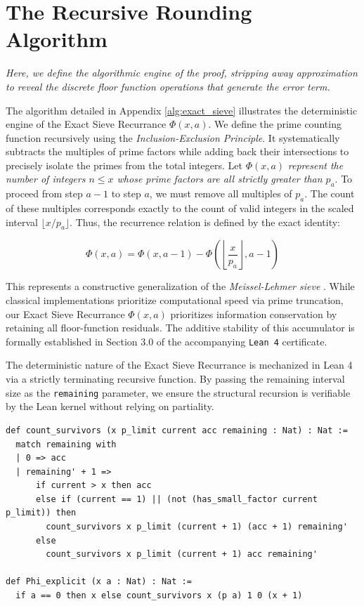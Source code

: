 \documentclass[sn-mathphys-num, pdflatex]{sn-jnl}
\begin{document}
\section{The Recursive Rounding Algorithm}
\label{sec:algorithm}

\textit{Here, we define the algorithmic engine of the proof, stripping away approximation to reveal the discrete floor function operations that generate the error term.}

The algorithm detailed in Appendix \ref{alg:exact_sieve} illustrates the deterministic engine of the Exact Sieve Recurrance $\Phi(x,a)$. We define the prime counting function recursively using the \textit{Inclusion-Exclusion Principle}. It systematically subtracts the multiples of prime factors while adding back their intersections to precisely isolate the primes from the total integers. Let $\Phi(x, a)$ \textit{\label{ESD} represent the number of integers $n \le x$ whose prime factors are all strictly greater than $p_a$}. To proceed from step $a-1$ to step $a$, we must remove all multiples of $p_a$. The count of these multiples corresponds exactly to the count of valid integers in the scaled interval $\lfloor x/p_a \rfloor$. Thus, the recurrence relation is defined by the exact identity:

\begin{equation}
\Phi(x,a) = \Phi(x,a-1) - \Phi\left(\left\lfloor \frac{x}{p_{a}} \right\rfloor, a-1\right)
\label{eq:exact_sieve}
\end{equation}

This represents a constructive generalization of the \textit{Meissel-Lehmer sieve} \cite{Lehmer1959, Crandall2005}. While classical implementations prioritize computational speed via prime truncation, our Exact Sieve Recurrance $\Phi(x,a)$ prioritizes information conservation by retaining all floor-function residuals. The additive stability of this accumulator is formally established in Section 3.0 of the accompanying \texttt{Lean 4} certificate.

The deterministic nature of the Exact Sieve Recurrance is mechanized in Lean 4 via a strictly terminating recursive function. By passing the remaining interval size as the \texttt{remaining} parameter, we ensure the structural recursion is verifiable by the Lean kernel without relying on partiality.

\begin{lstlisting}[caption={The Deterministic Exact Sieve Recurrence}, label={lst:count_survivors}]
def count_survivors (x p_limit current acc remaining : Nat) : Nat :=
  match remaining with
  | 0 => acc
  | remaining' + 1 =>
      if current > x then acc
      else if (current == 1) || (not (has_small_factor current p_limit)) then
        count_survivors x p_limit (current + 1) (acc + 1) remaining'
      else
        count_survivors x p_limit (current + 1) acc remaining'

def Phi_explicit (x a : Nat) : Nat :=
  if a == 0 then x else count_survivors x (p a) 1 0 (x + 1)
\end{lstlisting}
\end{document}
